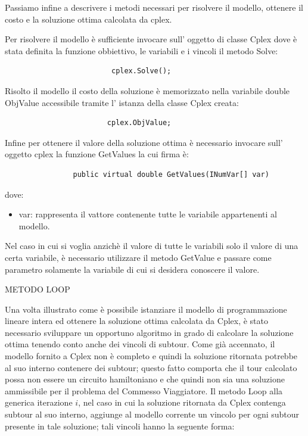 \documentclass[11pt]{article}
\begin{document}
Passiamo infine a descrivere i metodi necessari per risolvere il modello, ottenere il costo e la soluzione ottima calcolata da cplex.

Per risolvere il modello \`e sufficiente invocare sull' oggetto di classe Cplex dove \`e stata definita la funzione obbiettivo, le variabili e i vincoli il metodo Solve:

\begin{lstlisting}
                         cplex.Solve();
\end{lstlisting}

Risolto il modello il costo della soluzione \`e memorizzato nella variabile double ObjValue accessibile tramite l' istanza della classe Cplex creata:

\begin{lstlisting}
                        cplex.ObjValue; 
\end{lstlisting}

Infine per ottenere il valore della soluzione ottima \`e necessario invocare sull' oggetto cplex la funzione GetValues la cui firma \`e:

\begin{lstlisting}
                public virtual double GetValues(INumVar[] var)
\end{lstlisting}

dove:

\begin{itemize}
\item var: rappresenta il vattore contenente tutte le variabile appartenenti al modello.
\end{itemize}

Nel caso in cui si voglia anzich\`e il valore di tutte le variabili solo il valore di una certa variabile, è necessario utilizzare il metodo GetValue e passare come parametro solamente la variabile di cui si desidera conoscere il valore.

\vspace{2\baselineskip}
METODO LOOP
\vspace{2\baselineskip}

Una volta illustrato come \`e possibile istanziare il modello di programmazione lineare intera ed ottenere la soluzione ottima calcolata da Cplex, \`e stato necessario sviluppare un opportuno algoritmo in grado di calcolare la soluzione ottima tenendo conto anche dei vincoli di subtour. Come gi\`a accennato, il modello fornito a Cplex non \`e completo e quindi la soluzione ritornata potrebbe al suo interno contenere dei subtour;  questo fatto comporta che il tour calcolato possa non essere un circuito hamiltoniano e che quindi non sia una soluzione ammissibile per il problema del Commesso Viaggiatore. Il metodo Loop alla generica iterazione $i$, nel caso in cui la soluzione ritornata da Cplex contenga subtour al suo interno, aggiunge al modello corrente un vincolo per ogni subtour presente in tale soluzione; tali vincoli hanno la seguente forma:
\end{document}
